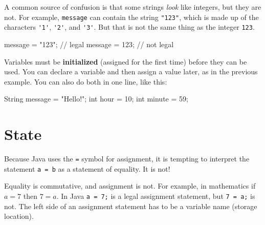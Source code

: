 \documentclass[12pt]{book}
\theoremstyle{exercise}
\newcommand{\java}[1]{\verb"#1"}
\begin{document}

A common source of confusion is that some strings {\em look} like integers, but they are not.
For example, \java{message} can contain the string \verb|"123"|, which is made up of the characters \java{'1'}, \java{'2'}, and \java{'3'}.
But that is not the same thing as the integer \java{123}.

\begin{code}
    message = "123";    // legal
    message = 123;      // not legal
\end{code}


Variables must be {\bf initialized} (assigned for the first time) before they can be used.
You can declare a variable and then assign a value later, as in the previous example.
You can also do both in one line, like this:

\begin{code}
    String message = "Hello!";
    int hour = 10;
    int minute = 59;
\end{code}

%
%


\section{State}
\label{state}

Because Java uses the \java{=} symbol for assignment, it is tempting to interpret the statement \java{a = b} as a statement of equality.
It is not!

Equality is commutative, and assignment is not.
For example, in mathematics if $a = 7$ then $7 = a$.
In Java \java{a = 7;} is a legal assignment statement, but \java{7 = a;} is not.
The left side of an assignment statement has to be a variable name (storage location).
\end{document}
